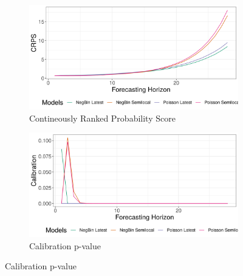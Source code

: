 \begin{figure}[H]
\begin{subfigure}{0.5\textwidth}
  \centering
  \includegraphics[width=\linewidth]{../output/Beni_crps.png}  
  \caption{Contineously Ranked Probability Score}
  \label{fig:sub-first}
\end{subfigure}
\begin{subfigure}{0.5\textwidth}
  \centering
  \includegraphics[width=\linewidth]{../output/Beni_calibration.png}  
  \caption{Calibration p-value}
  \label{fig:sub-second}
\end{subfigure}


\end{figure}
